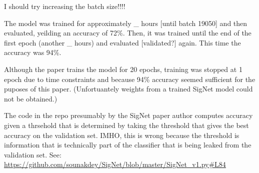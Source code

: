 I should try increasing the batch size!!!!

The model was trained for approximately \_ hours [until batch 19050] and then evaluated, yeilding an accuracy of 72\%.
Then, it was trained until the end of the first epoch (another \_ hours) and evaluated [validated?] again.
This time the accuracy was 94\%.

Although the paper trains the model for 20 epochs, training was stopped at 1 epoch due to time constraints and because 94\% accuracy seemed sufficient for the puposes of this paper.
(Unfortuantely weights from a trained SigNet model could not be obtained.)

The code in the repo presumably by the SigNet paper author computes accuracy given a thrsehold that is determined by taking the threshold that gives the best accuracy on the validation set.
IMHO, this is wrong because the threshold is information that is technically part of the classifier that is being leaked from the validation set.
See: \url{https://github.com/sounakdey/SigNet/blob/master/SigNet_v1.py#L84}
